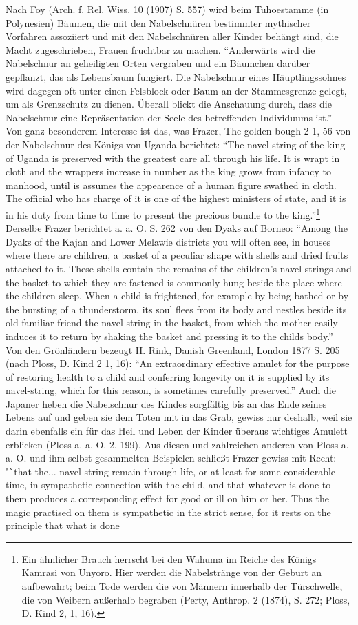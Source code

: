 \documentclass[a4paper, 11pt, oneside]{article}
\begin{document}
Nach Foy (Arch. f. Rel. Wiss. 10 (1907) S. 557) wird beim Tuhoestamme (in Polynesien) Bäumen, die mit den Nabelschnüren bestimmter mythischer Vorfahren assoziiert und mit den Nabelschnüren aller Kinder behängt sind, die Macht zugeschrieben, Frauen fruchtbar zu machen. "`Anderwärts wird die Nabelschnur an geheiligten Orten vergraben und ein Bäumchen darüber gepflanzt, das als Lebensbaum fungiert. Die Nabelschnur eines Häuptlingssohnes wird dagegen oft unter einen Felsblock oder Baum an der Stammesgrenze gelegt, um als Grenzschutz zu dienen. Überall blickt die Anschauung durch, dass die Nabelschnur eine Repräsentation der Seele des betreffenden Individuums ist."' --- Von ganz besonderem Interesse ist das, was Frazer, The golden bough 2 1, 56 von der Nabelschnur des Königs von Uganda berichtet: "`The navel-string of the king of Uganda is preserved with the greatest care all through his life. It is wrapt in cloth and the wrappers increase in number as the king grows from infancy to manhood, until is assumes the appearence of a human figure swathed in cloth. The official who has charge of it is one of the highest ministers of state, and it is in his duty from time to time to present the precious bundle to the king."'\footnote{Ein ähnlicher Brauch herrscht bei den Wahuma im Reiche des Königs Kamrasi von Unyoro. Hier werden die Nabelstränge von der Geburt an aufbewahrt; beim Tode werden die von Männern innerhalb der Türschwelle, die von Weibern außerhalb begraben (Perty, Anthrop. 2 (1874), S. 272; Ploss, D. Kind 2, 1, 16).} Derselbe Frazer berichtet a. a. O. S. 262 von den Dyaks auf Borneo: "`Among the Dyaks of the Kajan and Lower Melawie districts you will often see, in houses where there are children, a basket of a peculiar shape with shells and dried fruits attached to it. These shells contain the remains of the children's navel-strings and the basket to which they are fastened is commonly hung beside the place where the children sleep. When a child is frightened, for example by being bathed or by the bursting of a thunderstorm, its soul flees from its body and nestles beside its old familiar friend the navel-string in the basket, from which the mother easily induces it to return by shaking the basket and pressing it to the childs body."' Von den Grönländern bezeugt H. Rink, Danish Greenland, London 1877 S. 205 (nach Ploss, D. Kind 2 1, 16): "`An extraordinary effective amulet for the purpose of restoring health to a child and conferring longevity on it is supplied by its navel-string, which for this reason, is sometimes carefully preserved."' Auch die Japaner heben die Nabelschnur des Kindes sorgfältig bis an das Ende seines Lebens auf und geben sie dem Toten mit in das Grab, gewiss nur deshalb, weil sie darin ebenfalls ein für das Heil und Leben der Kinder überaus wichtiges Amulett erblicken (Ploss a. a. O. 2, 199). Aus diesen und zahlreichen anderen von Ploss a. a. O. und ihm selbst gesammelten Beispielen schließt Frazer gewiss mit Recht: "`that the... navel-string remain through life, or at least for some considerable time, in sympathetic connection with the child, and that whatever is done to them produces a corresponding effect for good or ill on him or her. Thus the magic practised on them is sympathetic in the strict sense, for it rests on the principle that what is done 
\end{document}
